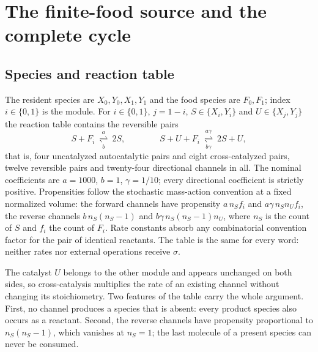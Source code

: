 \documentclass[11pt,a4paper]{article}
\theoremstyle{plain}
\theoremstyle{definition}
\theoremstyle{remark}
\begin{document}
\section{The finite-food source and the complete cycle}\label{sec:model}

\subsection{Species and reaction table}
The resident species are $X_0,Y_0,X_1,Y_1$ and the food species are $F_0,F_1$; index $i\in\{0,1\}$ is the module. For $i\in\{0,1\}$, $j=1-i$, $S\in\{X_i,Y_i\}$ and $U\in\{X_j,Y_j\}$ the reaction table contains the reversible pairs
\begin{equation}\label{eq:reactions}
 S+F_i\ \underset{b}{\overset{a}{\rightleftharpoons}}\ 2S,
 \qquad\qquad
 S+U+F_i\ \underset{b\gamma}{\overset{a\gamma}{\rightleftharpoons}}\ 2S+U ,
\end{equation}
that is, four uncatalyzed autocatalytic pairs and eight cross-catalyzed pairs, twelve reversible pairs and twenty-four directional channels in all. The nominal coefficients are $a=1000$, $b=1$, $\gamma=1/10$; every directional coefficient is strictly positive. Propensities follow the stochastic mass-action convention at a fixed normalized volume: the forward channels have propensity $a\,n_S f_i$ and $a\gamma\,n_S n_U f_i$, the reverse channels $b\,n_S(n_S-1)$ and $b\gamma\,n_S(n_S-1)n_U$, where $n_S$ is the count of $S$ and $f_i$ the count of $F_i$. Rate constants absorb any combinatorial convention factor for the pair of identical reactants. The table is the same for every word: neither rates nor external operations receive $\sigma$.

The catalyst $U$ belongs to the other module and appears unchanged on both sides, so cross-catalysis multiplies the rate of an existing channel without changing its stoichiometry. Two features of the table carry the whole argument. First, no channel produces a species that is absent: every product species also occurs as a reactant. Second, the reverse channels have propensity proportional to $n_S(n_S-1)$, which vanishes at $n_S=1$; the last molecule of a present species can never be consumed.
\end{document}
